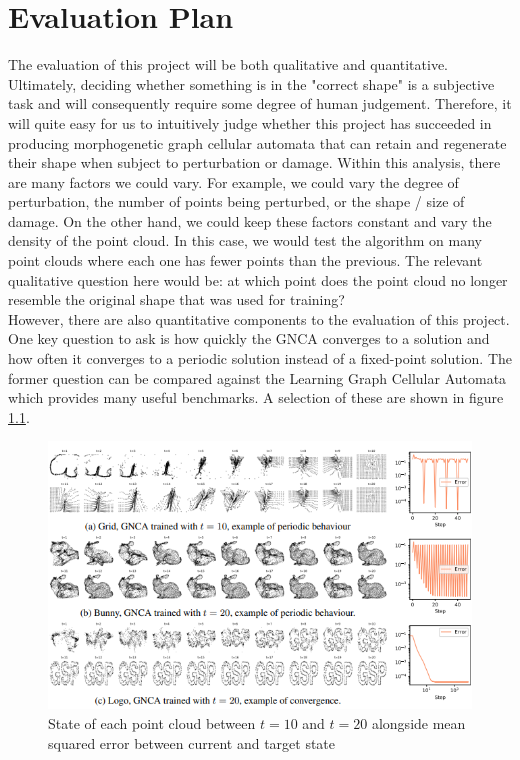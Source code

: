 \chapter{Evaluation Plan}

The evaluation of this project will be both qualitative and quantitative. Ultimately, deciding whether something is in the "correct shape" is a subjective task and will consequently require some degree of human judgement. Therefore, it will quite easy for us to intuitively judge whether this project has succeeded in producing morphogenetic graph cellular automata that can retain and regenerate their shape when subject to perturbation or damage. Within this analysis, there are many factors we could vary. For example, we could vary the degree of perturbation, the number of points being perturbed, or the shape / size of damage. On the other hand, we could keep these factors constant and vary the density of the point cloud. In this case, we would test the algorithm on many point clouds where each one has fewer points than the previous. The relevant qualitative question here would be: at which point does the point cloud no longer resemble the original shape that was used for training? \\

However, there are also quantitative components to the evaluation of this project. One key question to ask is how quickly the GNCA converges to a solution and how often it converges to a periodic solution instead of a fixed-point solution. The former question can be compared against the Learning Graph Cellular Automata \cite{grattarola2021learning} which provides many useful benchmarks. A selection of these are shown in figure \ref{fig:gnca-loss}.

\begin{figure}[!h]
    \centering
    \includegraphics[width=5in]{images/gnca_loss.png}
    \caption{State of each point cloud between $t=10$ and $t=20$ alongside mean squared error between current and target state}
    \label{fig:gnca-loss}
\end{figure}

